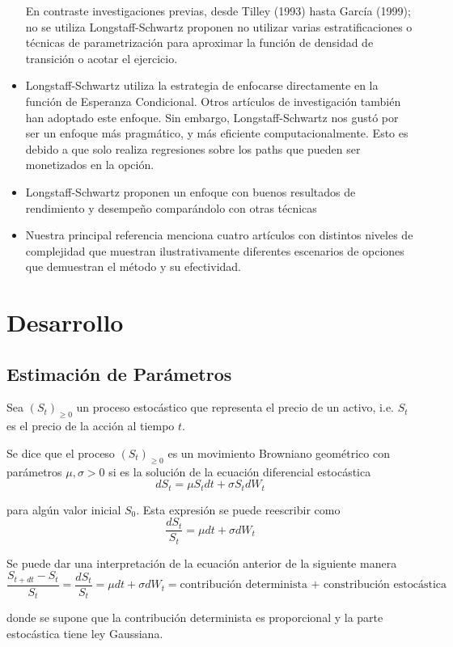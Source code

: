 \documentclass[12pt,reqno,letter]{article}
\begin{document}
\begin{itemize}
		En contraste investigaciones previas, desde Tilley (1993) hasta García (1999); no se utiliza Longstaff-Schwartz proponen no utilizar varias estratificaciones o técnicas de parametrización para aproximar la función de densidad de transición o acotar el ejercicio.
		\item Longstaff-Schwartz utiliza la estrategia de enfocarse directamente en la función de Esperanza Condicional. Otros artículos de investigación también han adoptado este enfoque. Sin embargo, Longstaff-Schwartz nos gustó por ser un enfoque más pragmático, y más eficiente computacionalmente. Esto es debido a que solo realiza regresiones sobre los paths que pueden ser monetizados en la opción. 
		\item Longstaff-Schwartz proponen un enfoque con buenos resultados de rendimiento y desempeño comparándolo con otras técnicas
		\item Nuestra principal referencia menciona cuatro artículos con distintos niveles de complejidad que muestran ilustrativamente diferentes escenarios de opciones que demuestran el método y su efectividad.
	\end{itemize}

	\section{Desarrollo}
	
	\subsection{Estimación de Parámetros}
	Sea $(S_t)_{\geq 0}$ un proceso estocástico que representa el precio de un activo, i.e. $S_t$ es el precio de la acción al tiempo $t$.
	
	Se dice que el proceso $(S_t)_{\geq 0}$ es un movimiento Browniano geométrico con parámetros $\mu,\sigma>0$ si es la solución de la ecuación diferencial estocástica
	$$dS_t = \mu S_t dt + \sigma S_t dW_t$$
	
	para algún valor inicial $S_0$.
	Esta expresión se puede reescribir como
	$$\frac{dS_t}{S_t} = \mu dt + \sigma dW_t$$
	
	Se puede dar una interpretación de la ecuación anterior de la siguiente manera
	$$\frac{S_{t+dt}-S_t}{S_t}=\frac{dS_t}{S_t} = \mu dt + \sigma dW_t = \mbox{contribución determinista + constribución estocástica}$$
	
	donde se supone que la contribución determinista es proporcional y la parte estocástica tiene ley Gaussiana.
	
\end{document}
